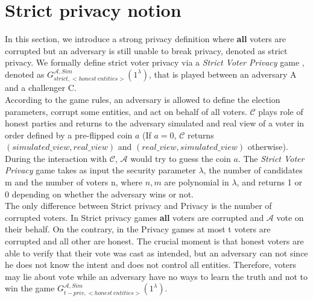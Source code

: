 \chapter{Strict privacy notion}
\label{strict}
In this section, we introduce a strong privacy definition where \textbf{all} voters are corrupted but an adversary is still unable to break privacy, denoted as strict privacy. We formally define strict voter privacy via a \textit{Strict Voter Privacy} game , denoted as $G_{strict,<honest~entities>}^{\mathcal{A}, Sim}(1^{\lambda})$,  that is played between an adversary A and a challenger C.\\

According to the game rules, an adversary is allowed to define the election parameters, corrupt some entities, and act on behalf of all voters.  $\mathcal{C}$ plays role of honest parties and returns to the adversary simulated and real view of a voter in order defined by a pre-flipped coin $a$ (If $a=0$, $\mathcal{C}$ returns $(simulated\_view,real\_view)$ and  $(real\_view,simulated\_view)$ otherwise). During the interaction with  $\mathcal{C}$,  $\mathcal{A}$ would try to guess the coin $a$. The \textit{Strict Voter Privacy} game takes as input the security parameter $\lambda$, the number of candidates m and the number of voters n, where $n,m$ are polynomial in $\lambda$, and returns 1 or 0 depending on whether the adversary wins or not.\\

The only difference between Strict privacy and Privacy is the number of corrupted voters. In Strict privacy games \textbf{all} voters are corrupted and  $\mathcal{A}$ vote on their behalf. On the contrary, in the Privacy games at most t voters are corrupted and all other are honest. The crucial moment is that honest voters are able to verify that their vote was cast as intended, but an adversary can not since he does not know the intent and does not control all entities. Therefore, voters may lie about vote while an adversary have no ways to learn the truth and not to win the game $G_{t-priv,<honest~entities>}^{\mathcal{A}, Sim}(1^{\lambda})$. \\

